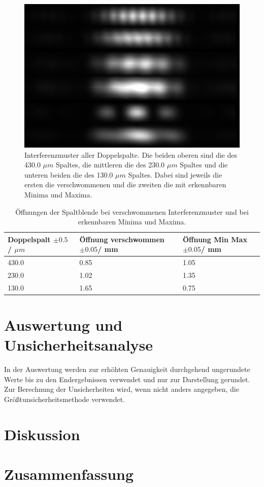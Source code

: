 \documentclass[12pt,a4paper,twoside]{article}
\begin{document}
\begin{figure}[H]
    \centering
    \includegraphics[width=0.6\linewidth]{nudes/aufgabe 4.jpg}
    \caption{Interferenzmuster aller Doppelspalte. Die beiden oberen sind die des 430.0 $\mu m$ Spaltes, die mittleren die des 230.0 $\mu m$ Spaltes und die unteren beiden die des 130.0 $\mu m$ Spaltes. 
    Dabei sind jeweils die ersten die verschwommenen und die zweiten die mit erkennbaren Minima und Maxima. }
    \label{fig:aufgabe 4}
\end{figure}

\begin{table}
    \centering
    \caption{Öffnungen der  Spaltblende bei verschwommenen Interferenzmuster und bei erkennbaren Minima und Maxima. }
    \label{tab:öffnungen}
    \begin{tabular}{| l | l | l |}
        \hline
        Doppelspalt $\pm 0.5$ / $\mu m $ & Öffnung verschwommen $\pm 0.05$/ mm & Öffnung Min Max $\pm 0.05$/ mm\\
        \hline
        430.0 & 0.85 & 1.05 \\
        230.0 & 1.02 & 1.35 \\
        130.0 & 1.65 & 0.75 \\
        \hline
    \end{tabular}
\end{table}

\section{Auswertung und Unsicherheitsanalyse} %

In der Auswertung werden zur erhöhten Genauigkeit durchgehend ungerundete Werte bis zu den Endergebnissen verwendet und nur zur Darstellung gerundet. \\
Zur Berechnung der Unsicherheiten wird, wenn nicht anders angegeben, die Größtunsicherheitsmethode verwendet.


\section{Diskussion} %


\section{Zusammenfassung} %

 
\printbibliography[heading=bibintoc]
\end{document}
